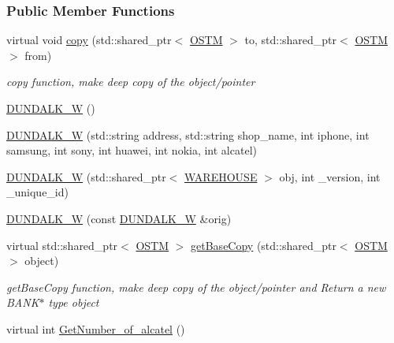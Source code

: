 \subsubsection*{Public Member Functions}
\begin{DoxyCompactItemize}
\item 
virtual void \hyperlink{class_d_u_n_d_a_l_k___w_a850117e656ee2961317f758e70e5d143_a850117e656ee2961317f758e70e5d143}{copy} (std\+::shared\+\_\+ptr$<$ \hyperlink{class_o_s_t_m}{O\+S\+TM} $>$ to, std\+::shared\+\_\+ptr$<$ \hyperlink{class_o_s_t_m}{O\+S\+TM} $>$ from)
\begin{DoxyCompactList}\small\item\em copy function, make deep copy of the object/pointer \end{DoxyCompactList}\item 
\hyperlink{class_d_u_n_d_a_l_k___w_ad459a77b4f3e0aaebb3d178eb014a77f_ad459a77b4f3e0aaebb3d178eb014a77f}{D\+U\+N\+D\+A\+L\+K\+\_\+W} ()
\item 
\hyperlink{class_d_u_n_d_a_l_k___w_ae295e04552eafc722b97900f97962fe8_ae295e04552eafc722b97900f97962fe8}{D\+U\+N\+D\+A\+L\+K\+\_\+W} (std\+::string address, std\+::string shop\+\_\+name, int iphone, int samsung, int sony, int huawei, int nokia, int alcatel)
\item 
\hyperlink{class_d_u_n_d_a_l_k___w_a12eb6e2b3a96d00049f55a693c63e64d_a12eb6e2b3a96d00049f55a693c63e64d}{D\+U\+N\+D\+A\+L\+K\+\_\+W} (std\+::shared\+\_\+ptr$<$ \hyperlink{class_w_a_r_e_h_o_u_s_e}{W\+A\+R\+E\+H\+O\+U\+SE} $>$ obj, int \+\_\+version, int \+\_\+unique\+\_\+id)
\item 
\hyperlink{class_d_u_n_d_a_l_k___w_a0ee6950b4b6cb12b73595e805be8ba64_a0ee6950b4b6cb12b73595e805be8ba64}{D\+U\+N\+D\+A\+L\+K\+\_\+W} (const \hyperlink{class_d_u_n_d_a_l_k___w}{D\+U\+N\+D\+A\+L\+K\+\_\+W} \&orig)
\item 
virtual std\+::shared\+\_\+ptr$<$ \hyperlink{class_o_s_t_m}{O\+S\+TM} $>$ \hyperlink{class_d_u_n_d_a_l_k___w_a06cbcac20829906b710962967795d4e6_a06cbcac20829906b710962967795d4e6}{get\+Base\+Copy} (std\+::shared\+\_\+ptr$<$ \hyperlink{class_o_s_t_m}{O\+S\+TM} $>$ object)
\begin{DoxyCompactList}\small\item\em get\+Base\+Copy function, make deep copy of the object/pointer and Return a new B\+A\+N\+K$\ast$ type object \end{DoxyCompactList}\item 
virtual int \hyperlink{class_d_u_n_d_a_l_k___w_ab7d0fcf5ec24a2c554e44caf50c325a3_ab7d0fcf5ec24a2c554e44caf50c325a3}{Get\+Number\+\_\+of\+\_\+alcatel} ()

\end{DoxyCompactItemize}
